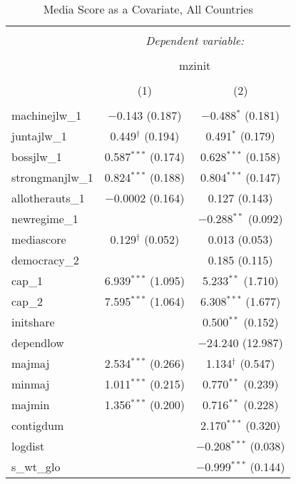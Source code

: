 
\begin{table}[!htbp] \centering 
  \caption{Media Score as a Covariate, All Countries} 
  \label{} 
\begin{tabular}{@{\extracolsep{5pt}}lcc} 
\\[-1.8ex]\hline 
\hline \\[-1.8ex] 
 & \multicolumn{2}{c}{\textit{Dependent variable:}} \\ 
\cline{2-3} 
\\[-1.8ex] & \multicolumn{2}{c}{mzinit} \\ 
\\[-1.8ex] & (1) & (2)\\ 
\hline \\[-1.8ex] 
 machinejlw\_1 & $-$0.143 (0.187) & $-$0.488$^{*}$ (0.181) \\ 
  juntajlw\_1 & 0.449$^{\dagger}$ (0.194) & 0.491$^{*}$ (0.179) \\ 
  bossjlw\_1 & 0.587$^{***}$ (0.174) & 0.628$^{***}$ (0.158) \\ 
  strongmanjlw\_1 & 0.824$^{***}$ (0.188) & 0.804$^{***}$ (0.147) \\ 
  allotherauts\_1 & $-$0.0002 (0.164) & 0.127 (0.143) \\ 
  newregime\_1 &  & $-$0.288$^{**}$ (0.092) \\ 
  mediascore & 0.129$^{\dagger}$ (0.052) & 0.013 (0.053) \\ 
  democracy\_2 &  & 0.185 (0.115) \\ 
  cap\_1 & 6.939$^{***}$ (1.095) & 5.233$^{**}$ (1.710) \\ 
  cap\_2 & 7.595$^{***}$ (1.064) & 6.308$^{***}$ (1.677) \\ 
  initshare &  & 0.500$^{**}$ (0.152) \\ 
  dependlow &  & $-$24.240 (12.987) \\ 
  majmaj & 2.534$^{***}$ (0.266) & 1.134$^{\dagger}$ (0.547) \\ 
  minmaj & 1.011$^{***}$ (0.215) & 0.770$^{**}$ (0.239) \\ 
  majmin & 1.356$^{***}$ (0.200) & 0.716$^{**}$ (0.228) \\ 
  contigdum &  & 2.170$^{***}$ (0.320) \\ 
  logdist &  & $-$0.208$^{***}$ (0.038) \\ 
  s\_wt\_glo &  & $-$0.999$^{***}$ (0.144) \\ 

\end{tabular}
\end{table}
